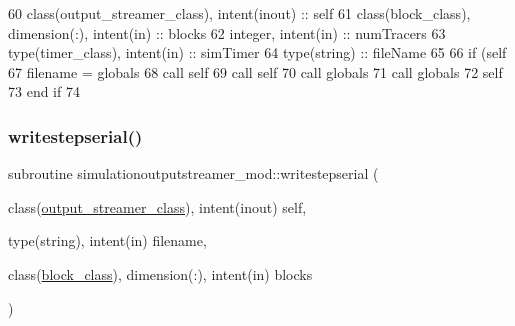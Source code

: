 \begin{DoxyCode}
60     \textcolor{keywordtype}{class}(output\_streamer\_class), \textcolor{keywordtype}{intent(inout)} :: self
61     \textcolor{keywordtype}{class}(block\_class), \textcolor{keywordtype}{dimension(:)}, \textcolor{keywordtype}{intent(in)} :: blocks
62     \textcolor{keywordtype}{integer}, \textcolor{keywordtype}{intent(in)} :: numTracers
63     \textcolor{keywordtype}{type}(timer\_class), \textcolor{keywordtype}{intent(in)} :: simTimer
64     \textcolor{keywordtype}{type}(string) :: fileName
65     
66     \textcolor{keywordflow}{if} (self%
67         filename = globals%
68         \textcolor{keyword}{call }self%
69         \textcolor{keyword}{call }self%
70         \textcolor{keyword}{call }globals%
71         \textcolor{keyword}{call }globals%
72         self%
73 \textcolor{keywordflow}{    end if}
74 
\end{DoxyCode}
\mbox{\label{namespacesimulationoutputstreamer__mod_af116b4ea9abff9117b9b1b9b5e6ab690}} 
\subsubsection{\texorpdfstring{writestepserial()}{writestepserial()}}
{\footnotesize\ttfamily subroutine simulationoutputstreamer\+\_\+mod\+::writestepserial (\begin{DoxyParamCaption}\item[{class(\mbox{\hyperlink{structsimulationoutputstreamer__mod_1_1output__streamer__class}{output\+\_\+streamer\+\_\+class}}), intent(inout)}]{self,  }\item[{type(string), intent(in)}]{filename,  }\item[{class(\mbox{\hyperlink{structblocks__mod_1_1block__class}{block\+\_\+class}}), dimension(\+:), intent(in)}]{blocks }\end{DoxyParamCaption})\hspace{0.3cm}{\ttfamily [private]}}



